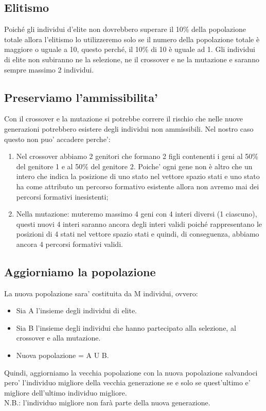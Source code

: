 \documentclass[10pt,a4paper]{article}
\begin{document}
    \subsection{Elitismo}
    \label{elitismoSubsection}
    Poiché gli individui d'elite non dovrebbero superare il 10\% della popolazione totale allora l'elitismo lo utilizzeremo solo se il numero della 
    popolazione totale è maggiore o uguale a 10, questo perché, il 10\% di 10 è uguale ad 1.
    Gli individui di elite non subiranno ne la selezione, ne il crossover e ne la mutazione e saranno sempre massimo 2 individui.
    
    \subsection{Preserviamo l'ammissibilita'}
    \label{PreserviamoAmmissibilitaSubsection}
    Con il crossover e la mutazione si potrebbe correre il rischio che nelle nuove generazioni potrebbero esistere degli individui non ammissibili. 
    Nel nostro caso questo non puo' accadere perche':
    \begin{enumerate}
      \item Nel crossover abbiamo 2 genitori che formano 2 figli contenenti i geni al 50\% del genitore 1 e al 50\% del genitore 2. 
      Poiche' ogni gene non è altro che un intero che indica la posizione di uno stato nel vettore spazio stati e uno stato ha come attributo un 
      percorso formativo esistente allora non avremo mai dei percorsi formativi inesistenti;
      \item Nella mutazione: muteremo massimo 4 geni con 4 interi diversi (1 ciascuno), questi nuovi 4 interi saranno ancora degli interi validi 
      poiché rappresentano le posizioni di 4 stati nel vettore spazio stati e quindi, di conseguenza, abbiamo ancora 4 percorsi formativi validi.
    \end{enumerate}
    
    \subsection{Aggiorniamo la popolazione}
    \label{aggiorniamoPopolazioneSubsection}
    La nuova popolazione sara' costituita da M individui, ovvero:
    \begin{itemize}
      \item Sia A l'insieme degli individui di elite.
      \item Sia B l'insieme degli individui che hanno partecipato alla selezione, al crossover e alla mutazione.
      \item Nuova popolazione = A U B.
    \end{itemize}
    Quindi, aggiorniamo la vecchia popolazione con la nuova popolazione salvandoci pero' l'individuo 
    migliore della vecchia generazione se e solo se quest'ultimo e' migliore dell'ultimo individuo 
    migliore.\\
    N.B.: l'individuo migliore non farà parte della nuova generazione.
    
\end{document}
